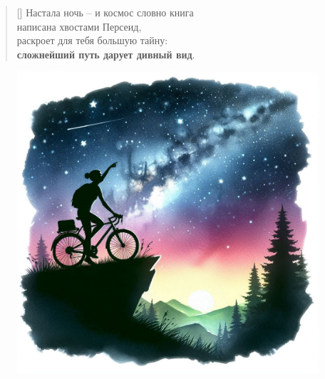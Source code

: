 \documentclass[a5paper,11pt]{memoir}
\begin{document}
\clearpage

\begin{verse}[\versewidth]
Настала ночь -- и космос словно книга\\
написана хвостами Персеид,\\
раскроет для тебя большую тайну:\\
\textbf{сложнейший путь дарует дивный вид}.
\end{verse}

\begin{figure}[h]
	\vspace{-30pt}
	\hspace{-32pt}
	\includegraphics[width=\paperwidth]{images/cyclist-night.png}
\end{figure}
\end{document}
